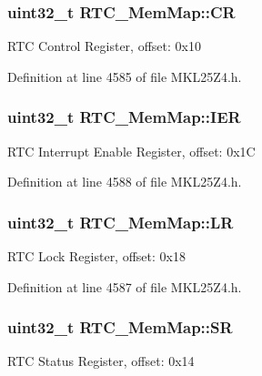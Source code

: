 \subsubsection[{\texorpdfstring{CR}{CR}}]{\setlength{\rightskip}{0pt plus 5cm}uint32\+\_\+t R\+T\+C\+\_\+\+Mem\+Map\+::\+CR}\hypertarget{struct_r_t_c___mem_map_a05c71be888cd40a4d91c631260d684d7}{}\label{struct_r_t_c___mem_map_a05c71be888cd40a4d91c631260d684d7}
R\+TC Control Register, offset\+: 0x10 

Definition at line 4585 of file M\+K\+L25\+Z4.\+h.

\subsubsection[{\texorpdfstring{I\+ER}{IER}}]{\setlength{\rightskip}{0pt plus 5cm}uint32\+\_\+t R\+T\+C\+\_\+\+Mem\+Map\+::\+I\+ER}\hypertarget{struct_r_t_c___mem_map_a1db69b589f5bfc5faa12b9c54e7c8061}{}\label{struct_r_t_c___mem_map_a1db69b589f5bfc5faa12b9c54e7c8061}
R\+TC Interrupt Enable Register, offset\+: 0x1C 

Definition at line 4588 of file M\+K\+L25\+Z4.\+h.

\subsubsection[{\texorpdfstring{LR}{LR}}]{\setlength{\rightskip}{0pt plus 5cm}uint32\+\_\+t R\+T\+C\+\_\+\+Mem\+Map\+::\+LR}\hypertarget{struct_r_t_c___mem_map_a6d1b4fe68ed53926b57392e7ad582469}{}\label{struct_r_t_c___mem_map_a6d1b4fe68ed53926b57392e7ad582469}
R\+TC Lock Register, offset\+: 0x18 

Definition at line 4587 of file M\+K\+L25\+Z4.\+h.

\subsubsection[{\texorpdfstring{SR}{SR}}]{\setlength{\rightskip}{0pt plus 5cm}uint32\+\_\+t R\+T\+C\+\_\+\+Mem\+Map\+::\+SR}\hypertarget{struct_r_t_c___mem_map_a82faed2f609de35e3b27d5fd27ba82e2}{}\label{struct_r_t_c___mem_map_a82faed2f609de35e3b27d5fd27ba82e2}
R\+TC Status Register, offset\+: 0x14 

